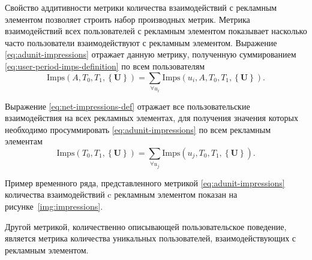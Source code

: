 Свойство аддитивности метрики количества взаимодействий с рекламным элементом позволяет строить набор производных метрик.
Метрика взаимодействий всех пользователей с рекламным элементом показывает насколько часто пользователи взаимодействуют с
рекламным элементом. Выражение \eqref{eq:adunit-impressions} отражает данную метрику, полученную суммированием 
\eqref{eq:user-period-imps-definition} по всем пользователям
\begin{equation}
    \text{Imps} \left(A, T_0, T_1, \left\{ \symbf{U} \right\} \right) =
    \sum \limits_{\forall u_i} \text{Imps} \left( u_i, A, T_0, T_1, \left\{ \symbf{U} \right\} \right).
    \label{eq:adunit-impressions}
\end{equation}

Выражение \eqref{eq:net-impressions-def} отражает все пользовательские взаимодействия на всех рекламных элементах, для 
получения значения которых необходимо просуммировать \eqref{eq:adunit-impressions} по всем рекламным элементам
\begin{equation}
    \text{Imps} \left(T_0, T_1, \left\{ \symbf{U} \right\} \right) =
    \sum \limits_{\forall u_j} \text{Imps} \left(u_j, T_0, T_1, \left\{ \symbf{U} \right\} \right).
    \label{eq:net-impressions-def}
\end{equation}

Пример временного ряда, представленного метрикой \eqref{eq:adunit-impressions} количества взаимодействий c рекламным элементом показан на рисунке~\ref{img:impressions}.


Другой метрикой, количественно описывающей пользовательское поведение, является метрика количества уникальных пользователей,
взаимодействующих с рекламным элементом.

